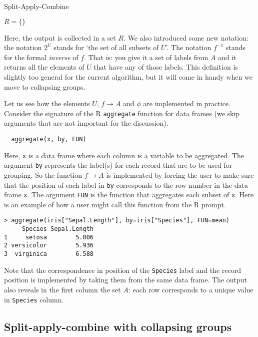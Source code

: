 \documentclass[11pt, fleqn]{article}
\begin{document}
\begin{algorithm}[H]
\caption{Split-Apply-Combine}

$R = \{\}$\;
\end{algorithm}
Here, the output is collected in a set $R$. We also introduced some new
notation: the notation $2^U$ stands for `the set of all subsets of $U$'. The
notation $f^{-1}$ stands for the formal \emph{inverse} of $f$. That is: you
give it a set of labels from $A$ and it returns all the elements of $U$ that
have any of those labels. This definition is slightly too general for the
current algorithm, but it will come in handy when we move to collapsing groups.

Let us see how the elements $U$, $f\to A$ and $\phi$ are implemented
in practice. Consider the signature of the R \texttt{aggregate} function for data
frames (we skip arguments that are not important for the discussion).
\begin{verbatim}
  aggregate(x, by, FUN)
\end{verbatim}
Here, \texttt{x} is a data frame where each column is a variable to be
aggregated.  The argument \texttt{by} represents the label(s) for each record
that are to be used for grouping. So the function $f\to A$ is implemented by
forcing the user to make sure that the position of each label in \texttt{by}
corresponds to the row number in the data frame \texttt{x}. The argument
\texttt{FUN} is the function that aggregates each subset of \texttt{x}.  Here is
an example of how a user might call this function from the R prompt.
%
\begin{verbatim}
> aggregate(iris["Sepal.Length"], by=iris["Species"], FUN=mean)
     Species Sepal.Length
1     setosa        5.006
2 versicolor        5.936
3  virginica        6.588
\end{verbatim}
%
Note that the correspondence in position of the \texttt{Species} label and the
record position is implemented by taking them from the same data frame. The output
also reveals in the first column the set $A$: each row corresponds to a unique
value in \texttt{Species} column.


\subsection{Split-apply-combine with collapsing groups}
\end{document}
